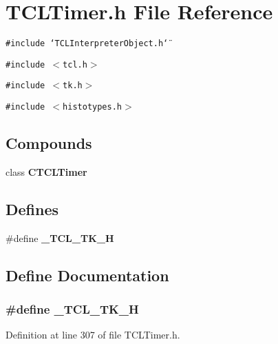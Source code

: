 \section{TCLTimer.h File Reference}
\label{TCLTimer_8h}
{\tt \#include \char`\"{}TCLInterpreter\-Object.h\char`\"{}}\par
{\tt \#include $<$tcl.h$>$}\par
{\tt \#include $<$tk.h$>$}\par
{\tt \#include $<$histotypes.h$>$}\par
\subsection*{Compounds}
\begin{CompactItemize}
\item 
class {\bf CTCLTimer}
\end{CompactItemize}
\subsection*{Defines}
\begin{CompactItemize}
\item 
\#define {\bf \_\-TCL\_\-TK\_\-H}
\end{CompactItemize}


\subsection{Define Documentation}
\subsubsection{\setlength{\rightskip}{0pt plus 5cm}\#define \_\-TCL\_\-TK\_\-H}\label{TCLTimer_8h_a0}




Definition at line 307 of file TCLTimer.h.